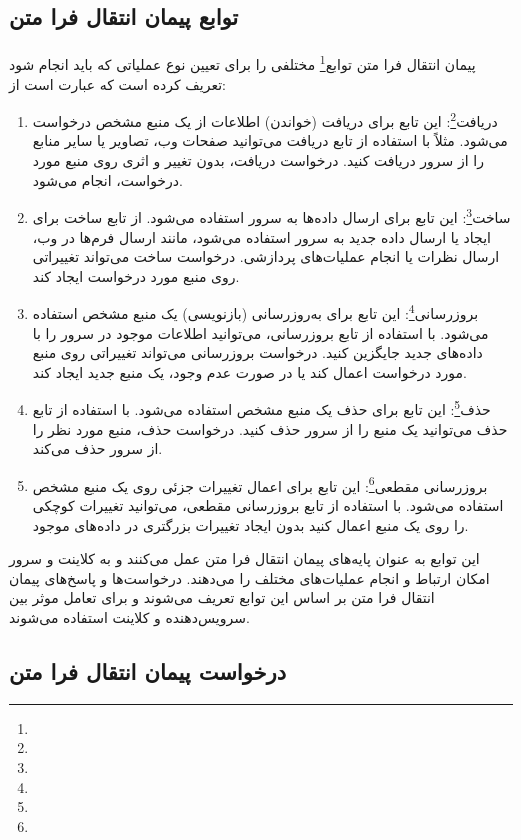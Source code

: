 \subsection{توابع پیمان انتقال فرا متن}
\label{subsec:http_methods}
\paragraph{}
{
    پیمان انتقال فرا متن توابع\footnote{} مختلفی را برای تعیین نوع عملیاتی که باید انجام شود تعریف کرده است که عبارت است از:
    \begin{enumerate}
        \item دریافت\footnote{}: این تابع برای دریافت (خواندن) اطلاعات از یک منبع مشخص درخواست می‌شود. مثلاً با استفاده از تابع دریافت می‌توانید صفحات وب، تصاویر یا سایر منابع را از سرور دریافت کنید. درخواست دریافت، بدون تغییر و اثری روی منبع مورد درخواست، انجام می‌شود.
        \item ساخت\footnote{}: این تابع برای ارسال داده‌ها به سرور استفاده می‌شود. از تابع ساخت برای ایجاد یا ارسال داده جدید به سرور استفاده می‌شود، مانند ارسال فرم‌ها در وب، ارسال نظرات یا انجام عملیات‌های پردازشی. درخواست ساخت می‌تواند تغییراتی روی منبع مورد درخواست ایجاد کند.
        \item بروزرسانی\footnote{}: این تابع برای به‌روزرسانی (بازنویسی) یک منبع مشخص استفاده می‌شود. با استفاده از تابع بروزرسانی، می‌توانید اطلاعات موجود در سرور را با داده‌های جدید جایگزین کنید. درخواست بروزرسانی می‌تواند تغییراتی روی منبع مورد درخواست اعمال کند یا در صورت عدم وجود، یک منبع جدید ایجاد کند.
        \item حذف\footnote{}: این تابع برای حذف یک منبع مشخص استفاده می‌شود. با استفاده از تابع حذف می‌توانید یک منبع را از سرور حذف کنید. درخواست حذف، منبع مورد نظر را از سرور حذف می‌کند.
        \item بروزرسانی مقطعی\footnote{}: این تابع برای اعمال تغییرات جزئی روی یک منبع مشخص استفاده می‌شود. با استفاده از تابع بروزرسانی مقطعی، می‌توانید تغییرات کوچکی را روی یک منبع اعمال کنید بدون ایجاد تغییرات بزرگتری در داده‌های موجود.
    \end{enumerate}
    این توابع به عنوان پایه‌های پیمان انتقال فرا متن عمل می‌کنند و به کلاینت و سرور امکان ارتباط و انجام عملیات‌های مختلف را می‌دهند. درخواست‌ها و پاسخ‌های پیمان انتقال فرا متن بر اساس این توابع تعریف می‌شوند و برای تعامل موثر بین سرویس‌دهنده و کلاینت استفاده می‌شوند.
}

\subsection{درخواست پیمان انتقال فرا متن}
\label{subsec:http_requests}
